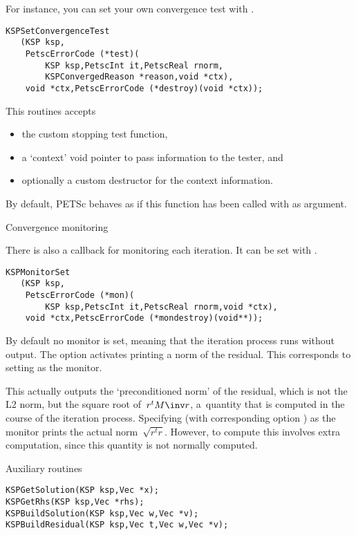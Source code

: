 For instance, you can set your own convergence test with
.
\begin{lstlisting}
KSPSetConvergenceTest
   (KSP ksp,
    PetscErrorCode (*test)(
        KSP ksp,PetscInt it,PetscReal rnorm,
        KSPConvergedReason *reason,void *ctx),
    void *ctx,PetscErrorCode (*destroy)(void *ctx));
\end{lstlisting}
This routines accepts 
\begin{itemize}
\item the custom stopping test function,
\item a `context' void pointer to pass information to the tester, and
\item optionally a custom destructor for the context information.
\end{itemize}
By default, PETSc behaves as if this function has been called with
 as argument.

 {Convergence monitoring}

There is also a callback for monitoring each iteration.
It can be set with .
\begin{lstlisting}
KSPMonitorSet
   (KSP ksp,
    PetscErrorCode (*mon)(
        KSP ksp,PetscInt it,PetscReal rnorm,void *ctx),
    void *ctx,PetscErrorCode (*mondestroy)(void**));
\end{lstlisting}
By default no monitor is set, meaning that the iteration process
runs without output.
The option  activates printing
a norm of the residual.
This corresponds to setting 
as the monitor.

This actually outputs the `preconditioned norm' of the residual,
which is not the L2 norm, but the square root of~$r^tM\inv r$,
a~quantity that is computed in the course of the iteration process.
Specifying 
(with corresponding option )
as the monitor prints the actual norm~$\sqrt{r^tr}$.
However, to compute this involves extra computation,
since this quantity is not normally computed.

 {Auxiliary routines}

\begin{lstlisting}
KSPGetSolution(KSP ksp,Vec *x);
KSPGetRhs(KSP ksp,Vec *rhs);
KSPBuildSolution(KSP ksp,Vec w,Vec *v);
KSPBuildResidual(KSP ksp,Vec t,Vec w,Vec *v);
\end{lstlisting}

